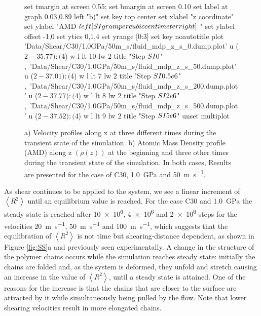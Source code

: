\documentclass[aps,prb,reprint,superscriptaddress, a4paper]{revtex4-1}
\begin{document}
\begin{figure}
\begin{center}
\begin{gnuplot}[terminal=pdf, terminaloptions={size \SERFigwidth cm, \SERFigheight cm color solid}]
			set tmargin at screen 0.55; set bmargin at screen 0.10
			set label at graph 0.03,0.89 left "b)"
			set key top center
			set xlabel "z coordinate"  
			set ylabel "AMD $\\left[ \\SI{}{\\gram\\per\\cubic\\centi\\meter} \\right]$ "
			set ylabel offset -1,0
			set ytics 0,1,4
			set yrange [0:3]
			set key noautotitle
			plot  	'Data/Shear/C30/1.0GPa/50m_s/fluid_mdp_z_s_0.dump.plot' u ($2-35.77):($4) w l  lt 10 lw 2   title "Step $\\SI{0}{}$" ,\
				  	'Data/Shear/C30/1.0GPa/50m_s/fluid_mdp_z_s_50.dump.plot' u ($2-37.01):($4) w l  lt 7 lw 2   title "Step $\\SI{0.5e6}{}$" ,\
				  	'Data/Shear/C30/1.0GPa/50m_s/fluid_mdp_z_s_200.dump.plot' u ($2-37.77):($4) w l  lt 8 lw 2   title "Step $\\SI{2e6}{}$" ,\
				  	'Data/Shear/C30/1.0GPa/50m_s/fluid_mdp_z_s_500.dump.plot' u ($2-37.52):($4) w l  lt 9  lw 2  title "Step $\\SI{5e6}{}$" 
			unset multiplot
		\end{gnuplot}
		\caption{a) Velocity profiles along x at three different times during the transient state of the simulation. b) Atomic Mass Density profile (AMD) along z $\left(\rho \left(z\right) \right)$ at the beginning and  three other times during the transient state of the simulation. In both cases, Results are presented for the case of  C30,  \SI{1.0}{\giga\pascal} and  \SI{50}{\meter\per\second}.}
		\label{fig:VelProf_MDP}
	\end{center}
 \end{figure}


As shear continues to be applied to the system,  we see a linear increment of $\left< R^2 \right> $ until an equilibrium value is reached. For the case C30 and \SI{1.0}{\giga\pascal}  the steady state is reached after \SI{10e6}{}, \SI{4e6}{} and \SI{2e6}{} steps for the velocities  \SI{20}{\meter\per\second}, \SI{50}{\meter\per\second} and \SI{100}{\meter\per\second}, which suggests that the equilibration of  $\left< R^2 \right> $ is not time but shearing-distance dependent, as shown in Figure \ref{fig:SS}a and previously seen experimentally\cite{Drummond2000}.   A change in the structure of the polymer chains occurs while the simulation reaches steady state: initially the  chains are folded and, as the system is deformed, they unfold and stretch causing an increase in the value of  $\left< R^2 \right> $, until a steady state is attained. One of the reasons  for the increase  is that the chains that are closer to the surface are attracted by it while simultaneously being pulled by the flow. Note that lower shearing velocities result in more elongated chains.
\end{document}
